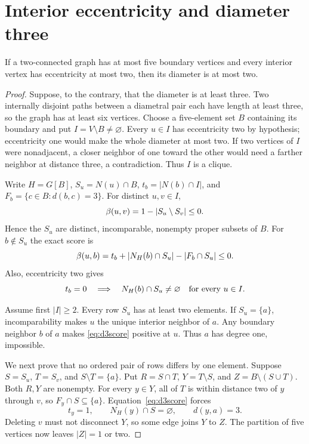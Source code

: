\section{Interior eccentricity and diameter three}\label{sec:diamthree}
\begin{lemma}\label{lem:ecc2}
If a two-connected graph has at most five boundary vertices and every
interior vertex has eccentricity at most two, then its diameter is at most two.
\end{lemma}
\begin{proof}
Suppose, to the contrary, that the diameter is at least three. Two internally
disjoint paths between a diametral pair each have length at least three, so the graph
has at least six vertices. Choose a five-element set $B$ containing its
boundary and put $I=V\setminus B\ne\varnothing$.
Every $u\in I$ has eccentricity two by hypothesis; eccentricity one would
make the whole diameter at most two.
If two vertices of $I$ were nonadjacent, a closer neighbor of one toward
the other would need a farther neighbor at distance three, a contradiction.
Thus $I$ is a clique.

Write $H=G[B]$, $S_u=N(u)\cap B$, $t_b=|N(b)\cap I|$, and
$F_b=\{c\in B:d(b,c)=3\}$. For distinct $u,v\in I$,
\begin{equation}\label{eq:antichain}
 \beta(u,v)=1-|S_u\setminus S_v|\le0.
\end{equation}
Hence the $S_u$ are distinct, incomparable, nonempty proper subsets of $B$.
For $b\notin S_u$ the exact score is
\begin{equation}\label{eq:d3score}
 \beta(u,b)=t_b+|N_H(b)\cap S_u|-|F_b\cap S_u|\le0.
\end{equation}
Also, eccentricity two gives
\begin{equation}\label{eq:d3center}
 t_b=0\quad\Longrightarrow\quad N_H(b)\cap S_u\ne\varnothing
 \quad\hbox{for every }u\in I.
\end{equation}

Assume first $|I|\ge2$. Every row $S_u$ has at least two elements.
If $S_u=\{a\}$, incomparability makes $u$ the unique interior neighbor
of $a$. Any boundary neighbor $b$ of $a$ makes \eqref{eq:d3score}
positive at $u$. Thus $a$ has degree one, impossible.

We next prove that no ordered pair of rows differs by one element.
Suppose $S=S_u$, $T=S_v$, and $S\setminus T=\{a\}$. Put
$R=S\cap T$, $Y=T\setminus S$, and $Z=B\setminus(S\cup T)$.
Both $R,Y$ are nonempty. For every $y\in Y$, all of $T$ is within
distance two of $y$ through $v$, so $F_y\cap S\subseteq\{a\}$.
Equation~\eqref{eq:d3score} forces
\[
 t_y=1,\qquad N_H(y)\cap S=\varnothing,\qquad d(y,a)=3.
\]
Deleting $v$ must not disconnect $Y$, so some edge joins $Y$ to $Z$.
The partition of five vertices now leaves $|Z|=1$ or two.


\end{proof}
